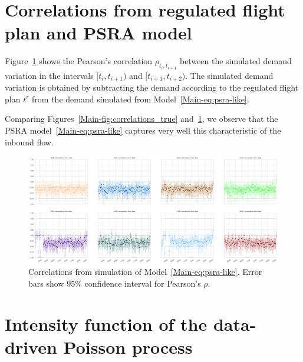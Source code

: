 \documentclass[]{elsarticle}
\begin{document}
\section{Correlations from regulated flight plan and \acs{PSRA} model}\label{sec:appb}

  Figure~\ref{fig:correlations_psra} shows the Pearson's correlation \(\rho_{t_i, t_{i+1}}\) between the simulated demand variation in the intervals \([t_i, t_{i+1})\) and \([t_{i+1}, t_{i+2})\). The simulated demand variation is obtained by subtracting the demand according to the regulated flight plan \(t^{r}\) from the demand simulated from Model~\eqref{Main-eq:psra-like}.

  Comparing Figures~\ref{Main-fig:correlations_true} and~\ref{fig:correlations_psra}, we observe that the \ac{PSRA} model~\eqref{Main-eq:psra-like} captures very well this characteristic of the inbound flow.

  \begin{figure}
      \includegraphics[width=\textwidth]{correlations_psra}
      \caption{Correlations from simulation of Model~\eqref{Main-eq:psra-like}. Error bars show 95\% confidence interval for Pearson's \(\rho\).}
      \label{fig:correlations_psra}
  \end{figure}


\section{Intensity function of the data-driven Poisson process}\label{sec:appd}
\end{document}
